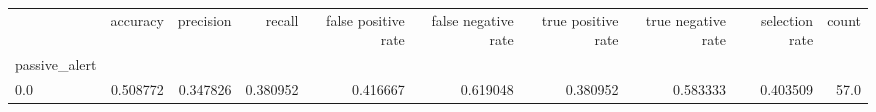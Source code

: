 \begin{tabular}{lrrrrrrrrr}
\toprule
{} &  accuracy &  precision &    recall &  false positive rate &  false negative rate &  true positive rate &  true negative rate &  selection rate &  count \\
passive\_alert &           &            &           &                      &                      &                     &                     &                 &        \\
\midrule
0.0           &  0.508772 &   0.347826 &  0.380952 &             0.416667 &             0.619048 &            0.380952 &            0.583333 &        0.403509 &   57.0 \\
\bottomrule
\end{tabular}
